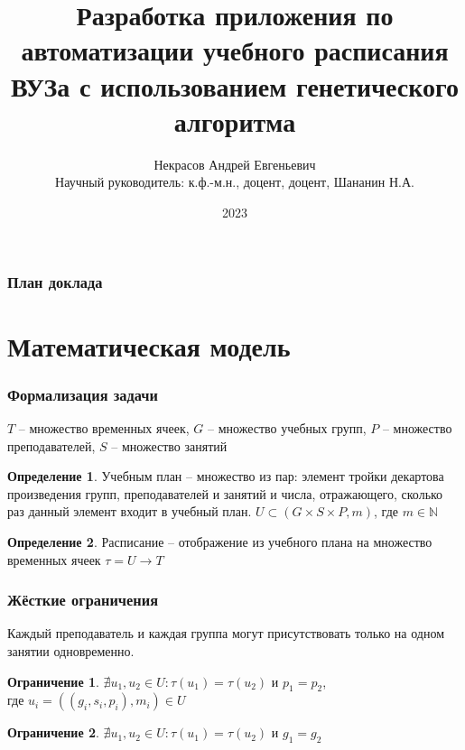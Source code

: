 \documentclass[t, 12pt]{beamer}
\theoremstyle{definition}
\newtheorem{определение}{Определение}
\newtheorem{ограничение}{Ограничение}
\begin{document}
  
    
    \author[Некрасов А.Е.]{Некрасов Андрей Евгеньевич \\ Научный руководитель: к.ф.-м.н., доцент, доцент, Шананин Н.А.}
    \title[ ]{\textbf{Разработка приложения по автоматизации учебного расписания ВУЗа с использованием генетического алгоритма}}
    \date[ ]{2023}

\begin{frame}[plain]
    \maketitle
\end{frame}

\begin{frame}[c]
\frametitle{План доклада}
\tableofcontents
\end{frame}

\section{Математическая модель}
\begin{frame}
\frametitle{Формализация задачи}
$T$ – множество временных ячеек, $G$ – множество учебных групп, $P$ – множество преподавателей, $S$ – множество занятий
\begin{определение}
Учебным план – множество из пар: элемент тройки декартова произведения групп, преподавателей и занятий и числа, отражающего, сколько раз данный элемент входит в учебный план.
$U \subset (G \times S \times P, m)$, где $m \in \mathbb{N}$
\end{определение}
\begin{определение}
Расписание – отображение из учебного плана на множество временных ячеек
$\tau = U \to T$
\end{определение}
\end{frame}

\begin{frame}
\frametitle{Жёсткие ограничения}
Каждый преподаватель и каждая группа могут присутствовать только на одном занятии одновременно.\\
\begin{ограничение}
$\nexists u_1, u_2 \in U: \tau(u_1)=\tau(u_2)$ и $p_1=p_2$,\\
где $u_i = ((g_i, s_i, p_i), m_i) \in U$
\end{ограничение}
\begin{ограничение}
$\nexists u_1, u_2 \in U: \tau(u_1)=\tau(u_2)$ и $g_1=g_2$
\end{ограничение}
\end{frame}
\end{document}
